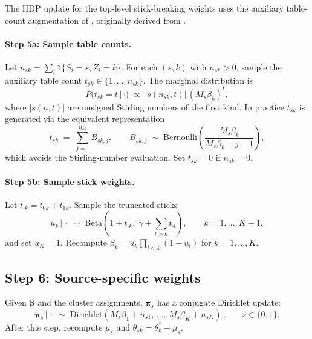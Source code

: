 \documentclass[11pt]{article}
\theoremstyle{plain}
\theoremstyle{definition}
\theoremstyle{remark}
\newcommand{\1}{\mathds{1}}
\newcommand{\given}{\,|\,}
\begin{document}
The HDP update for the top-level stick-breaking weights uses the auxiliary table-count augmentation of \citet{teh2006hierarchical}, originally derived from \citet{antoniak1974mixtures}.

\paragraph{Step 5a: Sample table counts.} Let $n_{sk} = \sum_i \1\{S_i = s, Z_i = k\}$. For each $(s, k)$ with $n_{sk} > 0$, sample the auxiliary table count $t_{sk} \in \{1, \ldots, n_{sk}\}$. The marginal distribution is
\begin{equation}
P(t_{sk} = t \given \cdot) \;\propto\; |s(n_{sk}, t)|\, (M_s \beta_k)^t,
\end{equation}
where $|s(n, t)|$ are unsigned Stirling numbers of the first kind. In practice $t_{sk}$ is generated via the equivalent representation
\begin{equation}
t_{sk} \;=\; \sum_{j=1}^{n_{sk}} B_{sk,j}, \qquad B_{sk,j} \;\sim\; \mathrm{Bernoulli}\!\left(\frac{M_s \beta_k}{M_s \beta_k + j - 1}\right),
\end{equation}
which avoids the Stirling-number evaluation. Set $t_{sk} = 0$ if $n_{sk} = 0$.

\paragraph{Step 5b: Sample stick weights.} Let $t_{\cdot k} = t_{0k} + t_{1k}$. Sample the truncated sticks
\begin{equation}
u_k \given \cdot \;\sim\; \mathrm{Beta}\!\left(1 + t_{\cdot k},\; \gamma + \sum_{l > k} t_{\cdot l}\right), \qquad k = 1, \ldots, K - 1,
\end{equation}
and set $u_K = 1$. Recompute $\beta_k = u_k \prod_{l < k}(1 - u_l)$ for $k = 1, \ldots, K$.

\subsection{Step 6: Source-specific weights}

Given $\bm{\beta}$ and the cluster assignments, $\bm{\pi}_s$ has a conjugate Dirichlet update:
\begin{equation}
\bm{\pi}_s \given \cdot \;\sim\; \mathrm{Dirichlet}(M_s \beta_1 + n_{s1},\, \ldots,\, M_s \beta_K + n_{sK}), \qquad s \in \{0, 1\}.
\end{equation}
After this step, recompute $\mu_s$ and $\theta_{sk} = \theta_k^* - \mu_s$.
\end{document}

